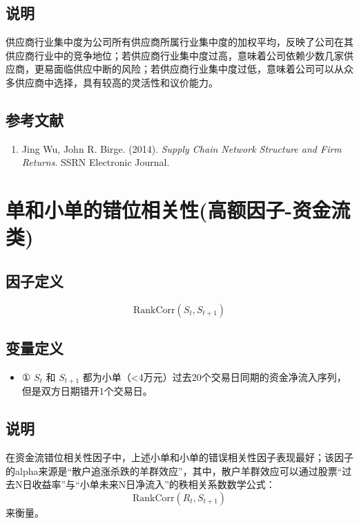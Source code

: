 \documentclass{article}
\begin{document}
\subsection{说明}
供应商行业集中度为公司所有供应商所属行业集中度的加权平均，反映了公司在其供应商行业中的竞争地位；若供应商行业集中度过高，意味着公司依赖少数几家供应商，更易面临供应中断的风险；若供应商行业集中度过低，意味着公司可以从众多供应商中选择，具有较高的灵活性和议价能力。

\subsection{参考文献}
\begin{enumerate}
    \item Jing Wu, John R. Birge. (2014). \textit{Supply Chain Network Structure and Firm Returns}. SSRN Electronic Journal.
\end{enumerate}

\section{单和小单的错位相关性(高额因子-资金流类)}

\subsection{因子定义}

\begin{equation}
    \mathrm{RankCorr}(S_t, S_{t+1})
\end{equation}

\subsection{变量定义}
\begin{itemize}
    \item ① \( S_t \) 和 \( S_{t+1} \) 都为小单（<4万元）过去20个交易日同期的资金净流入序列，但是双方日期错开1个交易日。
\end{itemize}

\subsection{说明}
在资金流错位相关性因子中，上述小单和小单的错误相关性因子表现最好；该因子的alpha来源是“散户追涨杀跌的羊群效应”，其中，散户羊群效应可以通过股票“过去N日收益率”与“小单未来N日净流入”的秩相关系数数学公式：
\begin{equation}
    \mathrm{RankCorr}(R_t, S_{t+1})
\end{equation}
来衡量。
\end{document}
